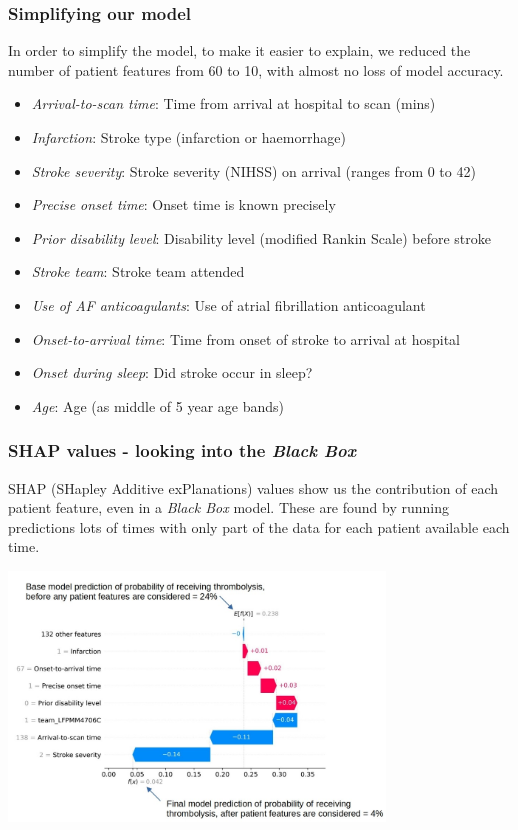 \documentclass{beamer}
\begin{document}

\begin{frame}
\frametitle{Simplifying our model}

In order to simplify the model, to make it easier to explain, we reduced the number of patient features from 60 to 10, with almost no loss of model accuracy.

\small
\begin{itemize}
    \item \emph{Arrival-to-scan time}: Time from arrival at hospital to scan (mins)
    \item \emph{Infarction}: Stroke type (infarction or haemorrhage)
    \item \emph{Stroke severity}: Stroke severity (NIHSS) on arrival (ranges from 0 to 42)
    \item \emph{Precise onset time}: Onset time is known precisely
    \item \emph{Prior disability level}: Disability level (modified Rankin Scale) before stroke
    \item \emph{Stroke team}: Stroke team attended
    \item \emph{Use of AF anticoagulants}: Use of atrial fibrillation anticoagulant
    \item \emph{Onset-to-arrival time}: Time from onset of stroke to arrival at hospital
    \item \emph{Onset during sleep}: Did stroke occur in sleep?
    \item \emph{Age}: Age (as middle of 5 year age bands)
\end{itemize}
\end{frame}


\begin{frame}
\frametitle{SHAP values - looking into the \emph{Black Box}}

SHAP (SHapley Additive exPlanations) values show us the contribution of each patient feature, even in a \emph{Black Box} model.
\vspace{2mm}
These are found by running predictions lots of times with only part of the data for each patient available each time.


\begin{center}
\includegraphics[width=0.75\textwidth]{./images/xgb_waterfall_low_probability_2}
\end{center}
\end{frame}
\end{document}
